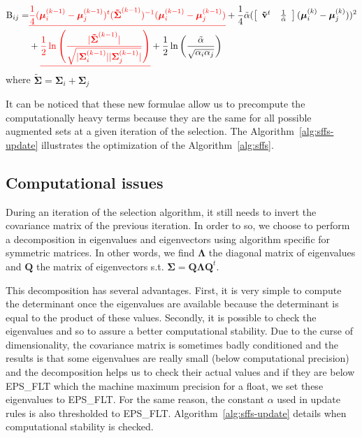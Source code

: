 \documentclass[a4paper,11pt,DIV=16]{scrartcl}
\newcommand*{\equl}[2]{%
    \textcolor{#1}{\underline{#2}}%
}
\begin{document}
        \begin{align*}
            \text{B}_{ij} = &\equl{red}{\frac{1}{4} (\boldsymbol{\mu}_i^{(k-1)} - \boldsymbol{\mu}_j^{(k-1)})^t ( \boldsymbol{\tilde{\Sigma}}^{(k-1)} )^{-1} (\boldsymbol{\mu}_i^{(k-1)} - \boldsymbol{\mu}_j^{(k-1)})} + \frac{1}{4} \tilde{\alpha} ( \left[\begin{array}{cc} \mathbf{\tilde{v}}^t & \frac{1}{\tilde{\alpha}} \end{array}\right] (\boldsymbol{\mu}_{i}^{(k)} - \boldsymbol{\mu}_{j}^{(k)}) )^2\\
            &+ \equl{red}{\frac{1}{2} \ln \left( \frac{|\boldsymbol{\tilde{\Sigma}}^{(k-1)}|}{\sqrt{|\boldsymbol{\Sigma}_i^{(k-1)}| |\boldsymbol{\Sigma}_j^{(k-1)}|}} \right)} + \frac{1}{2} \ln \left( \frac{\tilde{\alpha}}{\sqrt{\alpha_i \alpha_j}} \right)
        \end{align*}
        where $\boldsymbol{\tilde{\Sigma}} = \boldsymbol{\Sigma}_i + \boldsymbol{\Sigma}_j$

        It can be noticed that these new formulae allow us to precompute the computationally heavy terms because they are the same for all possible augmented sets at a given iteration of the selection. The Algorithm~\ref{alg:sffs-update} illustrates the optimization of the Algorithm~\ref{alg:sffs}.

        \subsection{Computational issues}

        During an iteration of the selection algorithm, it still needs to invert the covariance matrix of the previous iteration. In order to so, we choose to perform a decomposition in eigenvalues and eigenvectors using algorithm specific for symmetric matrices. In other words, we find $\boldsymbol{\Lambda}$ the diagonal matrix of eigenvalues and $\mathbf{Q}$ the matrix of eigenvectors s.t. $\boldsymbol{\Sigma} = \mathbf{Q} \boldsymbol{\Lambda} \mathbf{Q}^t$.

        This decomposition has several advantages. First, it is very simple to compute the determinant once the eigenvalues are available because the determinant is equal to the product of these values. Secondly, it is possible to check the eigenvalues and so to assure a better computational stability. Due to the curse of dimensionality, the covariance matrix is sometimes badly conditioned and the results is that some eigenvalues are really small (below computational precision) and the decomposition helps us to check their actual values and if they are below EPS\_FLT which the machine maximum precision for a float, we set these eigenvalues to EPS\_FLT. For the same reason, the constant $\alpha$ used in update rules is also thresholded to EPS\_FLT. Algorithm~\ref{alg:sffs-update} details when computational stability is checked.
\end{document}
